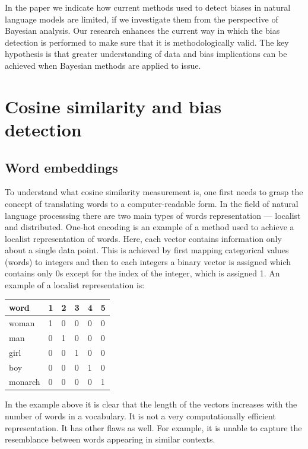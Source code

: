 \documentclass[
  12pt,
]{book}
\begin{document}
In the paper we indicate how current methods used to detect biases in natural language models are limited, if we investigate them from the perspective of Bayesian analysis. Our research enhances the current way in which the bias detection is performed to make sure that it is methodologically valid. The key hypothesis is that greater understanding of data and bias implications can be achieved when Bayesian methods are applied to issue.

\hypertarget{cosine-similarity-and-bias-detection}{%
\chapter{Cosine similarity and bias detection}\label{cosine-similarity-and-bias-detection}}

\hypertarget{word-embeddings}{%
\section{Word embeddings}\label{word-embeddings}}

To understand what cosine similarity measurement is, one first needs to grasp the concept of translating words to a computer-readable form. In the field of natural language processsing there are two main types of words representation --- localist and distributed. One-hot encoding is an example of a method used to achieve a localist representation of words. Here, each vector contains information only about a single data point. This is achieved by first mapping categorical values (words) to integers and then to each integers a binary vector is assigned which contains only 0s except for the index of the integer, which is assigned 1. An example of a localist representation is:

\begin{longtable}[]{@{}llllll@{}}
\toprule
word & 1 & 2 & 3 & 4 & 5 \\
\midrule
\endhead
woman & 1 & 0 & 0 & 0 & 0 \\
man & 0 & 1 & 0 & 0 & 0 \\
girl & 0 & 0 & 1 & 0 & 0 \\
boy & 0 & 0 & 0 & 1 & 0 \\
monarch & 0 & 0 & 0 & 0 & 1 \\
\bottomrule
\end{longtable}

In the example above it is clear that the length of the vectors increases with the number of words in a vocabulary. It is not a very computationally efficient representation. It has other flaws as well. For example, it is unable to capture the resemblance between words appearing in similar contexts.
\end{document}
